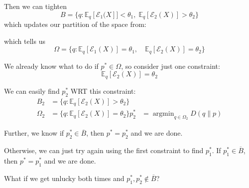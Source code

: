\documentclass[12pt]{report}
\newcommand{\E}{\mathbb{E}}
\newcommand{\Ec}{\mathcal{E}}
\renewcommand{\bar}[1]{\overline{#1}}
\DeclareMathOperator*{\argmin}{\arg\min}
\begin{document}
Then we can tighten
\[B = \{q: \E_q[\Ec_1(X]]< \theta_1, \; \E_q[\Ec_2(X)] > \theta_2\}\]
which updates our partition of the space from:

\begin{center}
	\hspace{1cm}
	\hspace{1cm}
\end{center}
which tells us
\[\Omega = \{q: \E_q[\Ec_1(X)] = \theta_1, \quad \E_q[\Ec_2(X)] = \theta_2\} \]

We already know what to do if $p^* \in \Omega$, so consider just one constraint:
\[\E_q[\Ec_2(X)] = \theta_2\]

We can easily find $p_2^*$ WRT this constraint:
\begin{align*}
	B_2      & = \{q: \E_q[\Ec_2(X)] > \theta_2\}          \\
	\Omega_2 & = \{q: \E_q[\Ec_2(X)] = \theta_2\}
	p_2^*    & = \argmin_{q \in \Omega_2} D(q \parallel p)
\end{align*}

Further, we know if $p_2^* \in \bar B$, then $p^* = p_2^*$ and we are done.

Otherwise, we can just try again using the first constraint to find $p_1^*$. If $p_1^* \in \bar B$, then $p^* = p_1^*$ and we are done.

What if we get unlucky both times and $p_1^*, p_2^* \notin \bar B$?
\end{document}
